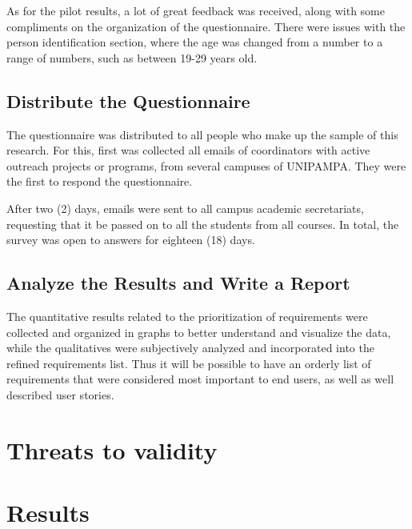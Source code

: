 As for the pilot results, a lot of great feedback was received, along with some compliments on the organization of the questionnaire. There were issues with the person identification section, where the age was changed from a number to a range of numbers, such as between 19-29 years old.

\subsection{Distribute the Questionnaire}\label{sec:survey-distribute}

The questionnaire was distributed to all people who make up the sample of this research. For this, first was collected all emails of coordinators with active outreach projects or programs, from several campuses of \ac{UNIPAMPA}. They were the first to respond the questionnaire.

After two (2) days, emails were sent to all campus academic secretariats, requesting that it be passed on to all the students from all courses. In total, the survey was open to answers for eighteen (18) days.

\subsection{Analyze the Results and Write a Report}\label{sec:survey-analyse}

The quantitative results related to the prioritization of requirements were collected and organized in graphs to better understand and visualize the data, while the qualitatives were subjectively analyzed and incorporated into the refined requirements list. Thus it will be possible to have an orderly list of requirements that were considered most important to end users, as well as well described user stories.

\section{Threats to validity}\label{sec:survey-validity}




\section{Results}\label{sec:survey-results}